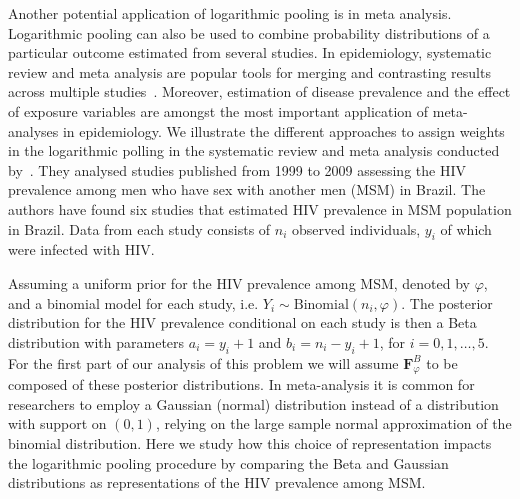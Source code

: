 \documentclass[12pt]{article}
\begin{document}
Another potential application of logarithmic pooling is in meta analysis.
Logarithmic pooling can also be used to combine probability distributions of a particular outcome estimated from several studies. 
In epidemiology, systematic review and meta analysis are popular tools for merging and contrasting results across multiple studies~\parencite[Chapter 33]{Rothman2008}.
Moreover, estimation of disease prevalence and the effect of exposure variables are amongst the most important application of meta-analyses in epidemiology.
We illustrate the different approaches to assign weights in the logarithmic polling in the systematic review and meta analysis conducted by~\textcite{Malta2010}. 
They analysed studies published from 1999 to 2009 assessing the HIV prevalence among men who have sex with another men (MSM) in Brazil. 
The authors have found six studies that estimated HIV prevalence in MSM population in Brazil. 
Data from each study consists of $n_i$ observed individuals, $y_i$ of which were infected with HIV.

Assuming a uniform prior for the HIV prevalence among MSM, denoted by $\varphi$, and a binomial model for each study, i.e. $Y_i \sim \text{Binomial}(n_i, \varphi)$. 
The posterior distribution for the HIV prevalence conditional on each study is then a Beta distribution with parameters $a_i = y_i + 1$ and $b_i = n_i - y_i + 1$, for $i=0,1, \ldots, 5$.
For the first part of our analysis of this problem we will assume $\boldsymbol F^{B}_\varphi$ to be composed of these posterior distributions.
In meta-analysis it is common for researchers to employ a Gaussian (normal) distribution instead of a distribution with support on $(0, 1)$, relying on the large sample normal approximation of the binomial distribution. 
Here we study how this choice of representation impacts the logarithmic pooling procedure by comparing the Beta and Gaussian distributions as representations of the HIV prevalence among MSM.
\end{document}
